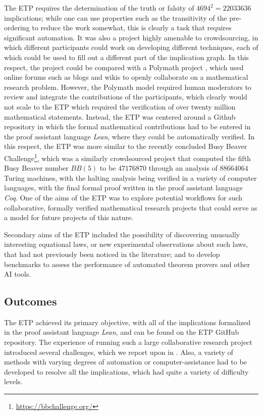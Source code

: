 The ETP requires the determination of the truth or falsity of $4694^2 = 22033636$ implications; while one can use properties such as the transitivity of the pre-ordering to reduce the work somewhat, this is clearly a task that requires significant automation. It was also a project highly amenable to crowdsourcing, in which different participants could work on developing different techniques, each of which could be used to fill out a different part of the implication graph. In this respect, the project could be compared with a Polymath project \cite{Gowers2009}, which used online forums such as blogs and wikis to openly collaborate on a mathematical research problem. However, the Polymath model required human moderators to review and integrate the contributions of the participants, which clearly would not scale to the ETP which required the verification of over twenty million mathematical statements. Instead, the ETP was centered around a Github repository in which the formal mathematical contributions had to be entered in the proof assistant language \emph{Lean}, where they could be automatically verified. In this respect, the ETP was more similar to the recently concluded Busy Beaver Challenge\footnote{\url{https://bbchallenge.org/}}, which was a similarly crowdsourced project that computed the fifth Busy Beaver number $BB(5)$ to be $47176870$ through an analysis of $88664064$ Turing machines, with the halting analysis being verified in a variety of computer languages, with the final formal proof written in the proof assistant language \emph{Coq}. One of the aims of the ETP was to explore potential workflows for such collaborative, formally verified mathematical research projects that could serve as a model for future projects of this nature.

Secondary aims of the ETP included the possibility of discovering unusually interesting equational laws, or new experimental observations about such laws, that had not previously been noticed in the literature; and to develop benchmarks to assess the performance of automated theorem provers and other AI tools.

\subsection{Outcomes}

The ETP achieved its primary objective, with all of the implications formalized in the proof assistant language \emph{Lean}, and can be found on the ETP GitHub repository. The experience of running such a large collaborative research project introduced several challenges, which we report upon in . Also, a variety of methods with varying degrees of automation or computer-assistance had to be developed to resolve all the implications, which had quite a variety of difficulty levels.

